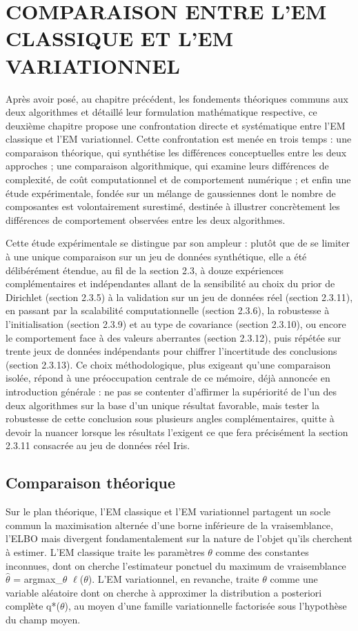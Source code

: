 \chapter{COMPARAISON ENTRE L'EM CLASSIQUE ET L'EM VARIATIONNEL}
Après avoir posé, au chapitre précédent, les fondements théoriques communs aux deux algorithmes et détaillé leur formulation mathématique respective, ce deuxième chapitre propose une confrontation directe et systématique entre l'EM classique et l'EM variationnel. Cette confrontation est menée en trois temps : une comparaison théorique, qui synthétise les différences conceptuelles entre les deux approches ; une comparaison algorithmique, qui examine leurs différences de complexité, de coût computationnel et de comportement numérique ; et enfin une étude expérimentale, fondée sur un mélange de gaussiennes dont le nombre de composantes est volontairement surestimé, destinée à illustrer concrètement les différences de comportement observées entre les deux algorithmes.

Cette étude expérimentale se distingue par son ampleur : plutôt que de se limiter à une unique comparaison sur un jeu de données synthétique, elle a été délibérément étendue, au fil de la section 2.3, à douze expériences complémentaires et indépendantes  allant de la sensibilité au choix du prior de Dirichlet (section 2.3.5) à la validation sur un jeu de données réel (section 2.3.11), en passant par la scalabilité computationnelle (section 2.3.6), la robustesse à l'initialisation (section 2.3.9) et au type de covariance (section 2.3.10), ou encore le comportement face à des valeurs aberrantes (section 2.3.12), puis répétée sur trente jeux de données indépendants pour chiffrer l'incertitude des conclusions (section 2.3.13). Ce choix méthodologique, plus exigeant qu'une comparaison isolée, répond à une préoccupation centrale de ce mémoire, déjà annoncée en introduction générale : ne pas se contenter d'affirmer la supériorité de l'un des deux algorithmes sur la base d'un unique résultat favorable, mais tester la robustesse de cette conclusion sous plusieurs angles complémentaires, quitte à devoir la nuancer lorsque les résultats l'exigent  ce que fera précisément la section 2.3.11 consacrée au jeu de données réel Iris.

\section{Comparaison théorique}
Sur le plan théorique, l'EM classique et l'EM variationnel partagent un socle commun  la maximisation alternée d'une borne inférieure de la vraisemblance, l'ELBO  mais divergent fondamentalement sur la nature de l'objet qu'ils cherchent à estimer. L'EM classique traite les paramètres $\theta $ comme des constantes inconnues, dont on cherche l'estimateur ponctuel du maximum de vraisemblance $\hat{\theta }$ = argmax\_$\theta $ $\ell $($\theta $). L'EM variationnel, en revanche, traite $\theta $ comme une variable aléatoire dont on cherche à approximer la distribution a posteriori complète q*($\theta $), au moyen d'une famille variationnelle factorisée sous l'hypothèse du champ moyen.

